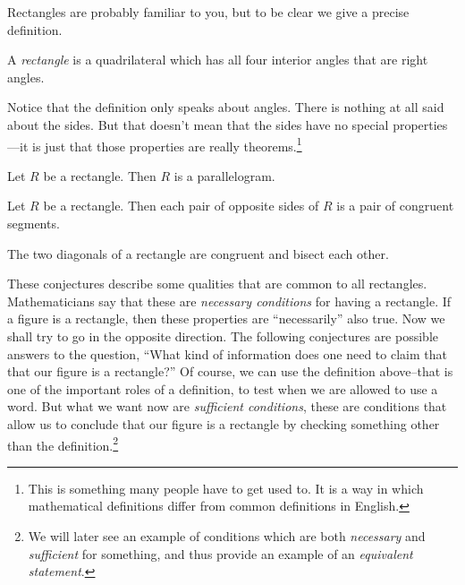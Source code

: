Rectangles are probably familiar to you, but to be clear we give a precise definition.
\begin{definition}\label{defn:rectangle}
A \emph{rectangle} is a quadrilateral which has all four interior angles that are right angles.
\end{definition}

Notice that the definition only speaks about angles. There is nothing at all said about the sides.
But that doesn't mean that the sides have no special properties---it is just that those properties are really theorems.\footnote{This is something many people have to get used to. It is a way in which mathematical definitions differ from common definitions in English.}

\begin{conjecture}\label{conj:rectangle-parallelogram}
Let $R$ be a rectangle. Then $R$ is a parallelogram.
\end{conjecture}

\begin{conjecture}\label{conj:rectangle-opp-sides}
Let $R$ be a rectangle. Then each pair of opposite sides of $R$ is a pair of congruent segments.
\end{conjecture}

\begin{conjecture}\label{conj:rectangle-diagonals}
The two diagonals of a rectangle are congruent and bisect each other.
\end{conjecture}


These conjectures describe some qualities that are common to all rectangles. Mathematicians say that these are \emph{necessary conditions} for having a rectangle.
If a figure is a rectangle, then these properties are ``necessarily'' also true. Now we shall try to go in the opposite direction.
The following conjectures are possible answers to the question, ``What kind of information does one need to claim that that our figure is a rectangle?''
Of course, we can use the definition above--that is one of the important roles of a definition, to test when we are allowed to use a word.
But what we want now are \emph{sufficient conditions}, these are conditions that allow us to conclude that our figure is a rectangle by checking something other than the definition.\footnote{We will later see an example of conditions which are both
\emph{necessary} and \emph{sufficient} for something, and thus provide an example of an \emph{equivalent statement}.}




